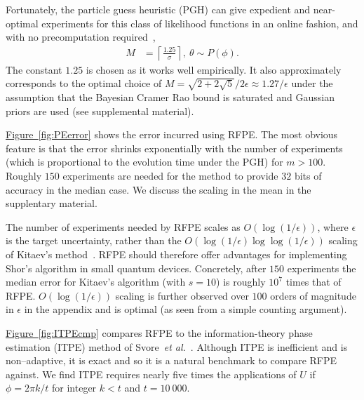 \documentclass[aps,prl,amsmath,twocolumn,amssymb,superscriptaddress]{revtex4-1}
\newcommand{\app}[1]{the supplentary material}
\newcommand{\fig}[1]{\hyperref[fig:#1]{Figure~\ref*{fig:#1}}}
\newcommand{\etal}{\emph{et al.}}
\newcommand{\ee}{\mathrm{e}}
\begin{document}
Fortunately, the particle guess heuristic (PGH) can give
expedient and
near-optimal experiments for this class of likelihood
functions in an online fashion, and with no precomputation
required~\cite{wiebe_hamiltonian_2014},
\begin{align}
    M &= \left\lceil\frac{1.25}{\sigma}\right\rceil,~
    \theta \sim P(\phi).\label{eq:PGH}
\end{align}
The constant $1.25$ is chosen as it works well empirically.  It also approximately corresponds to the optimal choice of $M=\sqrt{2+2\sqrt 5}/2\epsilon \approx 1.27/\epsilon$ under the assumption that the Bayesian Cramer Rao bound is saturated and Gaussian priors are used (see supplemental material).



\fig{PEerror} shows the error incurred using RFPE.  The most obvious feature is that the error shrinks exponentially with the number of experiments (which is proportional to the evolution time under the PGH) for $m>100$.  Roughly $150$ experiments are needed for the method to provide $32$ bits of accuracy in the median case.
We discuss the scaling in the mean in \app{var-reduction}.

The number of experiments needed by RFPE scales as $O(\log(1/\epsilon))$, where $\epsilon$ is the target uncertainty, rather than the $O(\log(1/\epsilon)\log\log(1/\epsilon))$ scaling of Kitaev's method~\cite{Kit96,kitaev2002classical}.  
 RFPE should therefore offer advantages for implementing Shor's algorithm in small quantum devices.
Concretely, after $150$ experiments the median error for Kitaev's algorithm (with $s=10$) is roughly $10^7$ times that of RFPE.  $O(\log(1/\epsilon))$ scaling  is further observed over $100$ orders of magnitude in $\epsilon$ in the appendix and is optimal (as seen from a simple counting argument).





\fig{ITPEcmp} compares RFPE to the information-theory phase estimation (ITPE) method of Svore~\etal~\cite{SHF14}.  Although ITPE is inefficient and is non--adaptive, it is exact and so it is a natural benchmark to compare RFPE against.  We find  ITPE requires nearly five times the applications of $U$ if $\phi=2\pi k/t$ for integer $k<t$ and $t=10~000$.
\end{document}
